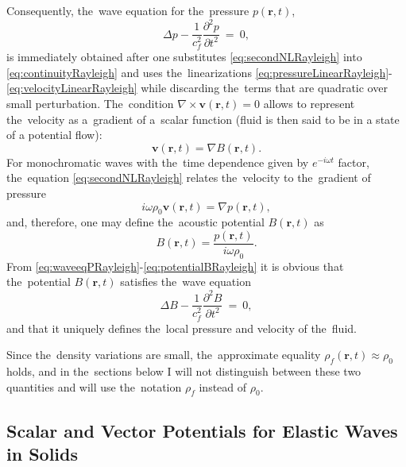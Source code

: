 Consequently, the~wave equation for the~pressure $p(\mathbf{r},t)$,
\begin{equation}
\label{eq:waveeqPRayleigh}
\Delta p - \frac{1}{c_f^2}\frac{\partial^2 p}{\partial t^2}~=~0,
\end{equation}
is immediately obtained after one substitutes \cref{eq:secondNLRayleigh} into \cref{eq:continuityRayleigh} and uses the~linearizations \cref{eq:pressureLinearRayleigh}-\cref{eq:velocityLinearRayleigh} while discarding the~terms that are quadratic over small perturbation.
%
The~condition $\nabla\times\mathbf{v}(\mathbf{r}, t) = 0$ allows to represent the~velocity as a~gradient of a~scalar function (fluid is then said to be in a state of a potential flow):
\begin{equation}
\mathbf{v}(\mathbf{r}, t)=\nabla B(\mathbf{r}, t).
\end{equation}
For monochromatic waves with the~time dependence given by $e^{-i\omega t}$ factor, the~equation \cref{eq:secondNLRayleigh} relates the~velocity to the~gradient of pressure
\begin{equation}
\label{eq:vandpRayleigh}
i\omega\rho_0\mathbf{v}(\mathbf{r},t) = \nabla p(\mathbf{r},t),
\end{equation}
and, therefore, one may define the~acoustic potential $B(\mathbf{r}, t)$ as
\begin{equation}
\label{eq:potentialBRayleigh}
B(\mathbf{r}, t) = \frac{p(\mathbf{r},t)}{i\omega\rho_0}.
\end{equation}
From \cref{eq:waveeqPRayleigh}-\cref{eq:potentialBRayleigh} it is obvious that the~potential $B(\mathbf{r}, t)$ satisfies the~wave equation
\begin{equation}
\label{eq:waveeqBRayleigh}
\Delta B - \frac{1}{c_f^2}\frac{\partial^2 B}{\partial t^2}~=~0,
\end{equation}
and that it uniquely defines the~local pressure and velocity of the~fluid.

Since the~density variations are small, the~approximate equality $\rho_f(\mathbf{r}, t) \approx \rho_0$ holds, and in the~sections below I will not distinguish between these two quantities and will use the~notation $\rho_f$ instead of $\rho_0$.


\subsection{Scalar and Vector Potentials for Elastic Waves in Solids}


